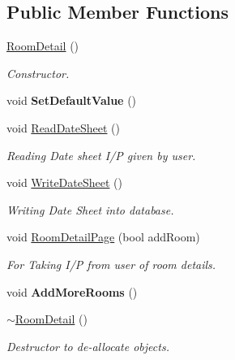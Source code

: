 \subsection*{Public Member Functions}
\begin{DoxyCompactItemize}
\item 
\hypertarget{classRoomDetail_acbbb21580bc1591daf23e614011acc06}{\hyperlink{classRoomDetail_acbbb21580bc1591daf23e614011acc06}{Room\-Detail} ()}\label{classRoomDetail_acbbb21580bc1591daf23e614011acc06}

\begin{DoxyCompactList}\small\item\em Constructor. \end{DoxyCompactList}\item 
\hypertarget{classRoomDetail_a117bed37b0f95b364b7133fe13afa9b7}{void {\bfseries Set\-Default\-Value} ()}\label{classRoomDetail_a117bed37b0f95b364b7133fe13afa9b7}

\item 
\hypertarget{classRoomDetail_ab8a07fd05ab314e85b374191e38e8556}{void \hyperlink{classRoomDetail_ab8a07fd05ab314e85b374191e38e8556}{Read\-Date\-Sheet} ()}\label{classRoomDetail_ab8a07fd05ab314e85b374191e38e8556}

\begin{DoxyCompactList}\small\item\em Reading Date sheet I/\-P given by user. \end{DoxyCompactList}\item 
\hypertarget{classRoomDetail_a90d4fc5bf3497068efecb5c9ec13e887}{void \hyperlink{classRoomDetail_a90d4fc5bf3497068efecb5c9ec13e887}{Write\-Date\-Sheet} ()}\label{classRoomDetail_a90d4fc5bf3497068efecb5c9ec13e887}

\begin{DoxyCompactList}\small\item\em Writing Date Sheet into database. \end{DoxyCompactList}\item 
\hypertarget{classRoomDetail_ab2c0a691ce4dea82d16f991c66021931}{void \hyperlink{classRoomDetail_ab2c0a691ce4dea82d16f991c66021931}{Room\-Detail\-Page} (bool add\-Room)}\label{classRoomDetail_ab2c0a691ce4dea82d16f991c66021931}

\begin{DoxyCompactList}\small\item\em For Taking I/\-P from user of room details. \end{DoxyCompactList}\item 
\hypertarget{classRoomDetail_ac4d4701717acda86a95c68ef5abbab28}{void {\bfseries Add\-More\-Rooms} ()}\label{classRoomDetail_ac4d4701717acda86a95c68ef5abbab28}

\item 
\hypertarget{classRoomDetail_ae65b9b167e75a7dc994c4e2021937c68}{\hyperlink{classRoomDetail_ae65b9b167e75a7dc994c4e2021937c68}{$\sim$\-Room\-Detail} ()}\label{classRoomDetail_ae65b9b167e75a7dc994c4e2021937c68}

\begin{DoxyCompactList}\small\item\em Destructor to de-\/allocate objects. \end{DoxyCompactList}\end{DoxyCompactItemize}
